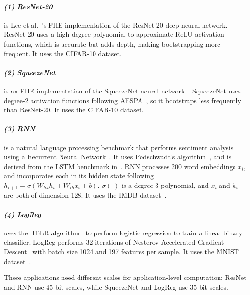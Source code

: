 \paragraph{\emph{(1) ResNet-20}}
is Lee et al.~\cite{lee:icml22:packed-resnet-fhe}'s
FHE implementation of the ResNet-20 deep neural network.
ResNet-20 uses a high-degree polynomial to approximate ReLU activation
functions, which is accurate but adds depth, making bootstrapping more
frequent.
It uses the CIFAR-10 dataset.

\paragraph{\emph{(2) SqueezeNet}}
is an FHE implementation of the SqueezeNet neural
network~\cite{krizhevsky2009learning,iandola2016squeezenet}.
SqueezeNet uses degree-2 activation functions following
AESPA~\cite{park2022aespa}, so it bootstraps less frequently than
ResNet-20.
It uses the CIFAR-10 dataset.

\paragraph{\emph{(3) RNN}}
is a natural language processing benchmark that performs sentiment analysis
using a Recurrent Neural Network~\cite{elman:rnn}.
It uses Podschwadt's algorithm~\cite{podschwadt2020classification},
and is derived from the LSTM benchmark in~\cite{samardzic:isca22:craterlake}.
RNN processes 200 word embeddings $x_i$, and incorporates each in
its hidden state following $h_{i+1} = \sigma(W_{hh} h_i + W_{ih} x_i + b)$.
$\sigma(\cdot)$ is a degree-3 polynomial, and
$x_i$ and $h_i$ are both of dimension 128.
It uses the IMDB dataset~\cite{maas-EtAl:2011:ACL-HLT2011}.

\paragraph{\emph{(4) LogReg}}
uses the HELR algorithm~\cite{han:iacr18:efficient-logreg} to perform logistic
regression to train a linear binary classifier.
LogReg performs 32 iterations of Nesterov Accelerated Gradient
Descent~\cite{ruder2016overview} with batch size 1024 and 197 features per
sample. %
It uses the MNIST dataset~\cite{lecun1998gradient}.

These applications need different scales for application-level computation:
ResNet and RNN use 45-bit scales, while SqueezeNet and LogReg use 35-bit scales.

